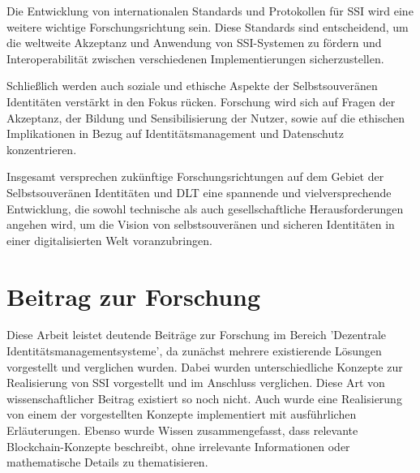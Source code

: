 Die Entwicklung von internationalen Standards und Protokollen für SSI wird eine weitere wichtige Forschungsrichtung sein. Diese Standards sind entscheidend, um die weltweite Akzeptanz und Anwendung von SSI-Systemen zu fördern und Interoperabilität zwischen verschiedenen Implementierungen sicherzustellen.

Schließlich werden auch soziale und ethische Aspekte der Selbstsouveränen Identitäten verstärkt in den Fokus rücken. Forschung wird sich auf Fragen der Akzeptanz, der Bildung und Sensibilisierung der Nutzer, sowie auf die ethischen Implikationen in Bezug auf Identitätsmanagement und Datenschutz konzentrieren.

Insgesamt versprechen zukünftige Forschungsrichtungen auf dem Gebiet der Selbstsouveränen Identitäten und DLT eine spannende und vielversprechende Entwicklung, die sowohl technische als auch gesellschaftliche Herausforderungen angehen wird, um die Vision von selbstsouveränen und sicheren Identitäten in einer digitalisierten Welt voranzubringen.

\section{Beitrag zur Forschung}
Diese Arbeit leistet deutende Beiträge zur Forschung im Bereich 'Dezentrale Identitätsmanagementsysteme', da zunächst mehrere existierende Lösungen vorgestellt und verglichen wurden. Dabei wurden unterschiedliche Konzepte zur Realisierung von SSI vorgestellt und im Anschluss verglichen.  Diese Art von wissenschaftlicher Beitrag existiert so noch nicht. Auch wurde eine Realisierung von einem der vorgestellten Konzepte implementiert mit ausführlichen Erläuterungen. Ebenso wurde Wissen zusammengefasst, dass relevante Blockchain-Konzepte beschreibt, ohne irrelevante Informationen oder mathematische Details zu thematisieren.